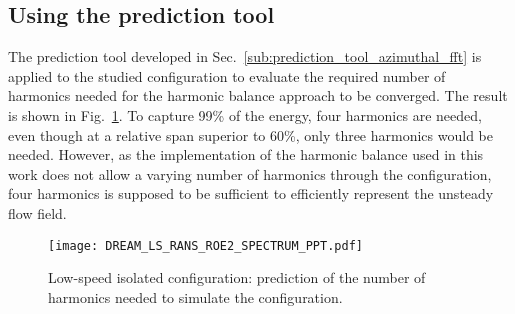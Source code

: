 
\subsection{Using the prediction tool}
\label{sub:dream_ls_conv_hb_prediction_tool}

The prediction tool developed in 
Sec.~\ref{sub:prediction_tool_azimuthal_fft} is applied
to the studied configuration to evaluate the
required number of harmonics needed for the
harmonic balance approach to be converged.
The result is shown in Fig.~\ref{fig:DREAM_LS_RANS_ROE2_SPECTRUM_PPT}.
To capture 99\% of the energy, four harmonics are needed, even though
at a relative span superior to 60\%, only three harmonics would be needed.
However, as the implementation of the harmonic balance used
in this work does not allow a varying number of harmonics through the
configuration, four harmonics is supposed to be sufficient to efficiently 
represent the unsteady flow field.
\begin{figure}[htp]
  \centering
  \texttt{[image: DREAM\_LS\_RANS\_ROE2\_SPECTRUM\_PPT.pdf]}
  \caption{Low-speed isolated configuration: prediction of the number
  of harmonics needed to simulate the configuration.}
  \label{fig:DREAM_LS_RANS_ROE2_SPECTRUM_PPT}
\end{figure}

